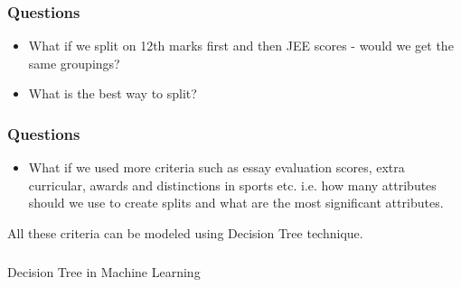 


\begin{frame}[fragile]\frametitle{Questions}
\begin{itemize}
	\item What if we split on 12th marks first and then JEE scores - would we get the same groupings? 
	\item What is the best way to split?
	\end{itemize}
\end{frame}

\begin{frame}[fragile]\frametitle{Questions}
\begin{itemize}
	\item What if we used more criteria such as essay evaluation scores, extra curricular, awards and distinctions in sports etc. i.e. how many attributes should we use to create splits and what are the most significant attributes.
	\end{itemize}
All these criteria can be modeled using Decision Tree technique.
\end{frame}

\begin{frame}[fragile]\frametitle{}
\begin{center}
{\Large Decision Tree in Machine Learning}
\end{center}
\end{frame}



